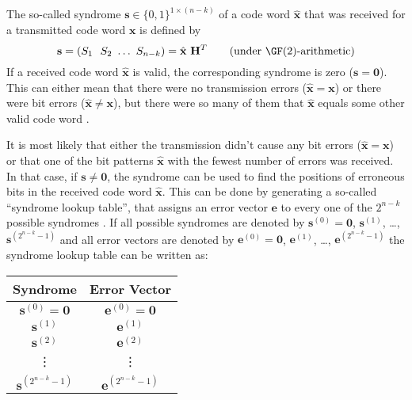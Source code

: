 The so-called syndrome $\mathbf s \in \{ 0, 1 \}^{1 \times (n - k)}$ of a code word $\mathbf {\hat x}$ that was received for a transmitted code word $\mathbf x$ is defined by \cite[Section 13.2, Equation 10]{carlson_commsys}
\begin{equation}
	\mathbf s = (S_1 ~~ S_2 ~ \dots ~ S_{n-k}) = \hat{\mathbf x} ~ \mathbf H^T \qquad \text{(under $\GF(2)$-arithmetic)}
\end{equation}
If a received code word $\hat{\mathbf x}$ is valid, the corresponding syndrome is zero ($\mathbf s = \mathbf 0$).
This can either mean that there were no transmission errors ($\hat{\mathbf x} = \mathbf x$) or there were bit errors ($\hat{\mathbf x} \neq \mathbf x$), but there were so many of them that $\hat{\mathbf x}$ equals some other valid code word \cite[Section 13.2, Syndrome Decoding]{carlson_commsys}.

It is most likely that either the transmission didn't cause any bit errors ($\hat{\mathbf x} = \mathbf x$) or that one of the bit patterns $\hat{\mathbf x}$ with the fewest number of errors was received.
In that case, if $\mathbf s \neq \mathbf 0$, the syndrome can be used to find the positions of erroneous bits in the received code word $\hat{\mathbf x}$.
This can be done by generating a so-called ``syndrome lookup table'', that assigns an error vector $\mathbf e$ to every one of the $2^{n - k}$ possible syndromes \cite[Section 13.2, Syndrome Decoding]{carlson_commsys}.
If all possible syndromes are denoted by $\mathbf s^{(0)} = \mathbf 0$, $\mathbf s^{(1)}$, \ldots, $\mathbf s^{\left(2^{n - k} - 1 \right)}$ and all error vectors are denoted by $\mathbf e^{(0)} = \mathbf 0$, $\mathbf e^{(1)}$, \ldots, $\mathbf e^{\left(2^{n - k} - 1 \right)}$ the syndrome lookup table can be written as:
\begin{center}
\begin{tabular}{| c | c |}
	\hline \textbf{Syndrome} & \textbf{Error Vector} \\ \hline \rule{0pt}{2.6ex}
	$\mathbf s^{(0)} = \mathbf 0$ & $\mathbf e^{(0)} = \mathbf 0$ \\
	$\mathbf s^{(1)}$ & $\mathbf e^{(1)}$ \\
	$\mathbf s^{(2)}$ & $\mathbf e^{(2)}$ \\
	\vdots & \vdots \\
	$\mathbf s^{\left(2^{n - k} - 1 \right)}$ & $\mathbf e^{\left(2^{n - k} - 1 \right)}$ \\ \hline
\end{tabular}
\end{center}

